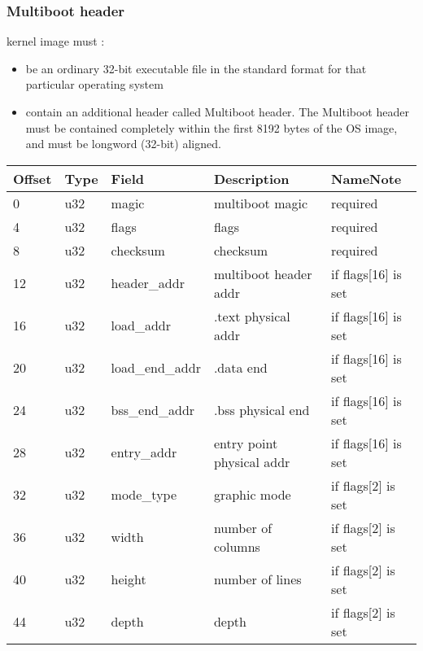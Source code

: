 \begin{frame}
  \frametitle{Multiboot header}
  kernel image must :

  \begin{itemize}
  \item be an ordinary 32-bit executable file in the standard format for that particular operating system
  \item contain an additional header called Multiboot header. The Multiboot header must be contained completely within the first 8192 bytes of the OS image, and must be longword (32-bit) aligned.
  \end{itemize}

  \begin{tabular}{|l|l|l|l|l|}
  \hline
  Offset & Type & Field & Description & NameNote\\\hline\hline
  0 & u32 & magic & multiboot magic & required\\\hline
  4 & u32 & flags & flags & required\\\hline
  8 & u32 & checksum & checksum & required\\\hline
  12 & u32 & header\_addr & multiboot header addr & if flags[16] is set\\\hline
  16 & u32 & load\_addr & .text physical addr & if flags[16] is set\\\hline
  20 & u32 & load\_end\_addr & .data end & if flags[16] is set\\\hline
  24 & u32 & bss\_end\_addr & .bss physical end & if flags[16] is set\\\hline
  28 & u32 & entry\_addr & entry point physical addr & if flags[16] is set\\\hline
  32 & u32 & mode\_type  & graphic mode & if flags[2] is set\\\hline
  36 & u32 & width & number of columns & if flags[2] is set\\\hline
  40 & u32 & height & number of lines & if flags[2] is set\\\hline
  44 & u32 & depth & depth & if flags[2] is set\\\hline
  \end{tabular}

\end{frame}

